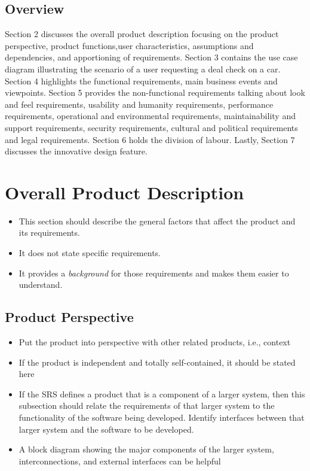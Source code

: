 \documentclass[]{article}
\begin{document}
\subsection{Overview}
\label{sub:overview}
Section 2 discusses the overall product description focusing on the product perspective, product functions,user characteristics, assumptions and dependencies, and apportioning of requirements. Section 3 contains the use case diagram illustrating the scenario of a user requesting a deal check on a car. Section 4 highlights the functional requirements, main business events and viewpoints. Section 5 provides the non-functional requirements talking about look and feel requirements, usability and humanity requirements, performance requirements, operational and environmental requirements, maintainability and support requirements, security requirements, cultural and political requirements and legal requirements. Section 6 holds the division of labour. Lastly, Section 7 discusses the innovative design feature.


\section{Overall Product Description}
\label{sec:overall_description}

\begin{itemize}
	\item This section should describe the general factors that affect the product and its requirements. 
	\item It does not state specific requirements.
	\item It provides a \emph{background} for those requirements and makes them easier to understand.
\end{itemize}


\subsection{Product Perspective}
\label{sub:product_perspective}
\begin{itemize}
	\item Put the product into perspective with other related products, i.e., context
	\item If the product is independent and totally self-contained, it should be stated here
	\item If the SRS defines a product that is a component of a larger system, then this subsection should relate the requirements of that larger system to the functionality of the software being developed. Identify interfaces between that larger system and the software to be developed.
	\item A block diagram showing the major components of the larger system, interconnections, and external interfaces can be helpful
\end{itemize}
\end{document}
